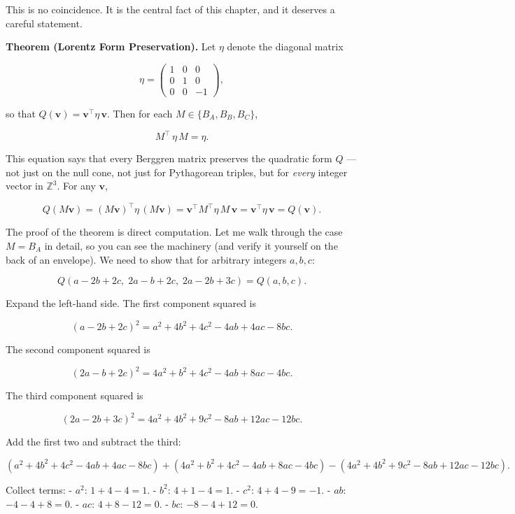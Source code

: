 \documentclass[12pt, letterpaper, openany]{book}
\theoremstyle{definition}
\theoremstyle{remark}
\begin{document}
This is no coincidence. It is the central fact of this chapter, and it deserves a careful statement.

\textbf{Theorem (Lorentz Form Preservation).} Let $\eta$ denote the diagonal matrix

\[
\eta = \begin{pmatrix} 1 & 0 & 0 \\ 0 & 1 & 0 \\ 0 & 0 & -1 \end{pmatrix},
\]

so that $Q(\mathbf{v}) = \mathbf{v}^\top \eta\, \mathbf{v}$. Then for each $M \in \{B_A, B_B, B_C\}$,

\[
M^{\!\top}\, \eta\, M = \eta.
\]

This equation says that every Berggren matrix preserves the quadratic form $Q$ --- not just on the null cone, not just for Pythagorean triples, but for \textit{every} integer vector in $\mathbb{Z}^3$. For any $\mathbf{v}$,

\[
Q(M\mathbf{v}) = (M\mathbf{v})^\top \eta\, (M\mathbf{v}) = \mathbf{v}^\top M^\top \eta\, M\, \mathbf{v} = \mathbf{v}^\top \eta\, \mathbf{v} = Q(\mathbf{v}).
\]

The proof of the theorem is direct computation. Let me walk through the case $M = B_A$ in detail, so you can see the machinery (and verify it yourself on the back of an envelope). We need to show that for arbitrary integers $a, b, c$:

\[
Q(a - 2b + 2c,\; 2a - b + 2c,\; 2a - 2b + 3c) = Q(a, b, c).
\]

Expand the left-hand side. The first component squared is

\[
(a - 2b + 2c)^2 = a^2 + 4b^2 + 4c^2 - 4ab + 4ac - 8bc.
\]

The second component squared is

\[
(2a - b + 2c)^2 = 4a^2 + b^2 + 4c^2 - 4ab + 8ac - 4bc.
\]

The third component squared is

\[
(2a - 2b + 3c)^2 = 4a^2 + 4b^2 + 9c^2 - 8ab + 12ac - 12bc.
\]

Add the first two and subtract the third:

\[
(a^2 + 4b^2 + 4c^2 - 4ab + 4ac - 8bc) + (4a^2 + b^2 + 4c^2 - 4ab + 8ac - 4bc) - (4a^2 + 4b^2 + 9c^2 - 8ab + 12ac - 12bc).
\]

Collect terms:
- $a^2$: $1 + 4 - 4 = 1$.
- $b^2$: $4 + 1 - 4 = 1$.
- $c^2$: $4 + 4 - 9 = -1$.
- $ab$: $-4 - 4 + 8 = 0$.
- $ac$: $4 + 8 - 12 = 0$.
- $bc$: $-8 - 4 + 12 = 0$.
\end{document}
